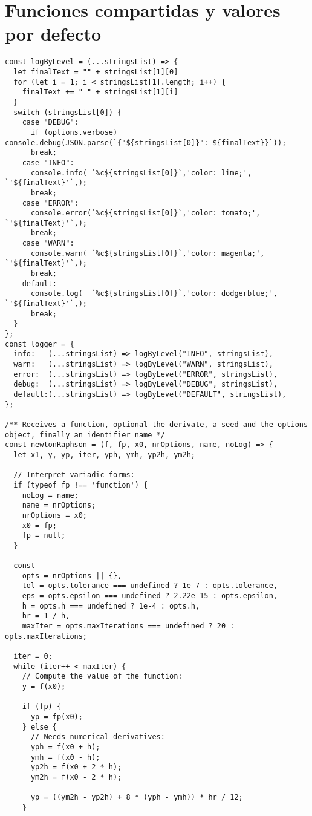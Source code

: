 \section{Funciones compartidas y valores por defecto}
\begin{verbatim}
const logByLevel = (...stringsList) => {
  let finalText = "" + stringsList[1][0]
  for (let i = 1; i < stringsList[1].length; i++) {
    finalText += " " + stringsList[1][i]
  }
  switch (stringsList[0]) {
    case "DEBUG":
      if (options.verbose) console.debug(JSON.parse(`{"${stringsList[0]}": ${finalText}}`));
      break;
    case "INFO": 
      console.info( `%c${stringsList[0]}`,'color: lime;', `'${finalText}'`,);
      break;
    case "ERROR":
      console.error(`%c${stringsList[0]}`,'color: tomato;', `'${finalText}'`,);
      break;
    case "WARN":
      console.warn( `%c${stringsList[0]}`,'color: magenta;', `'${finalText}'`,);
      break;
    default:
      console.log(  `%c${stringsList[0]}`,'color: dodgerblue;', `'${finalText}'`,);
      break;
  }
};
const logger = {
  info:   (...stringsList) => logByLevel("INFO", stringsList),
  warn:   (...stringsList) => logByLevel("WARN", stringsList),
  error:  (...stringsList) => logByLevel("ERROR", stringsList),
  debug:  (...stringsList) => logByLevel("DEBUG", stringsList),
  default:(...stringsList) => logByLevel("DEFAULT", stringsList),
};

/** Receives a function, optional the derivate, a seed and the options object, finally an identifier name */
const newtonRaphson = (f, fp, x0, nrOptions, name, noLog) => {
  let x1, y, yp, iter, yph, ymh, yp2h, ym2h;

  // Interpret variadic forms:
  if (typeof fp !== 'function') {
    noLog = name;
    name = nrOptions;
    nrOptions = x0;
    x0 = fp;
    fp = null;
  }

  const 
    opts = nrOptions || {},
    tol = opts.tolerance === undefined ? 1e-7 : opts.tolerance,
    eps = opts.epsilon === undefined ? 2.22e-15 : opts.epsilon,
    h = opts.h === undefined ? 1e-4 : opts.h,
    hr = 1 / h,
    maxIter = opts.maxIterations === undefined ? 20 : opts.maxIterations;

  iter = 0;
  while (iter++ < maxIter) {
    // Compute the value of the function:
    y = f(x0);

    if (fp) {
      yp = fp(x0);
    } else {
      // Needs numerical derivatives:
      yph = f(x0 + h);
      ymh = f(x0 - h);
      yp2h = f(x0 + 2 * h);
      ym2h = f(x0 - 2 * h);

      yp = ((ym2h - yp2h) + 8 * (yph - ymh)) * hr / 12;
    }


\end{verbatim}
